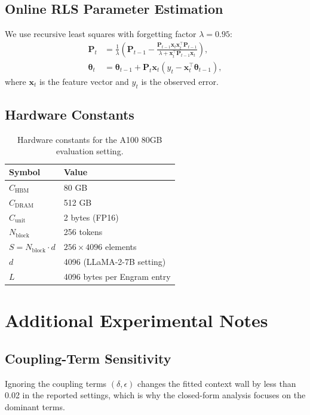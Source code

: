\documentclass[11pt,a4paper]{article}
\theoremstyle{plain}
\theoremstyle{definition}
\begin{document}
\subsection{Online RLS Parameter Estimation}
We use recursive least squares with forgetting factor $\lambda = 0.95$:
\begin{align*}
\mathbf{P}_{t} &= \frac{1}{\lambda}\left(\mathbf{P}_{t-1} - \frac{\mathbf{P}_{t-1}\mathbf{x}_t\mathbf{x}_t^\top\mathbf{P}_{t-1}}{\lambda + \mathbf{x}_t^\top\mathbf{P}_{t-1}\mathbf{x}_t}\right), \\
\boldsymbol{\theta}_{t} &= \boldsymbol{\theta}_{t-1} + \mathbf{P}_{t}\mathbf{x}_t(y_t - \mathbf{x}_t^\top\boldsymbol{\theta}_{t-1}),
\end{align*}
where $\mathbf{x}_t$ is the feature vector and $y_t$ is the observed error.

\subsection{Hardware Constants}
\begin{table}[h]
\centering
\caption{Hardware constants for the A100 80GB evaluation setting.}
\begin{tabular}{@{}ll@{}}
\toprule
Symbol & Value \\
\midrule
$C_{\text{HBM}}$ & 80 GB \\
$C_{\text{DRAM}}$ & 512 GB \\
$C_{\text{unit}}$ & 2 bytes (FP16) \\
$N_{\text{block}}$ & 256 tokens \\
$S = N_{\text{block}}\cdot d$ & $256 \times 4096$ elements \\
$d$ & 4096 (LLaMA-2-7B setting) \\
$L$ & 4096 bytes per Engram entry \\
\bottomrule
\end{tabular}
\end{table}

\section{Additional Experimental Notes}
\label{app:extra}

\subsection{Coupling-Term Sensitivity}
Ignoring the coupling terms $(\delta,\epsilon)$ changes the fitted context wall by less than 0.02 in the reported settings, which is why the closed-form analysis focuses on the dominant terms.
\end{document}
